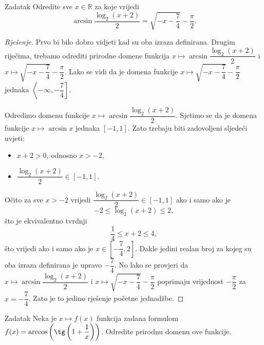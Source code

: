 \begin{exercise}{Zadatak}
Odredite sve \(x\in \mathbb{R}\) za koje vrijedi
\[\arcsin{\dfrac{\log_2(x+2)}{2}}=\sqrt{-x-\dfrac{7}{4}}-\dfrac{\pi}{2}.\]
\end{exercise}
\begin{proof}[Rješenje]
Prvo bi bilo dobro vidjeti kad su oba izraza definirana. Drugim riječima, trebamo odrediti prirodne domene funkcija \(x\mapsto \arcsin{\dfrac{\log_2(x+2)}{2}}\) i \(x\mapsto \sqrt{-x-\dfrac{7}{4}}-\dfrac{\pi}{2}\). Lako se vidi da je domena funkcije \(x\mapsto \sqrt{-x-\dfrac{7}{4}}-\dfrac{\pi}{2}\) jednaka \(\left\langle -\infty, -\dfrac{7}{4}\right]\).

Odredimo domenu funkcije \(x\mapsto \arcsin{\dfrac{\log_2(x+2)}{2}}\). Sjetimo se da je domena funkcije \(x\mapsto \arcsin{x}\) jednaka \([-1, 1]\). Zato trebaju biti zadovoljeni sljedeći uvjeti:
\begin{itemize}
\item \(x+2>0\), odnosno \(x>-2\),
\item \(\dfrac{\log_2(x+2)}{2}\in [-1, 1]\).
\end{itemize}
Očito za sve \(x>-2\) vrijedi \(\dfrac{\log_2(x+2)}{2}\in [-1, 1]\) ako i samo ako je
\[-2\leq \log_2(x+2)\leq 2,\]
što je ekvivalentno tvrdnji
\[\dfrac{1}{4}\leq x+2\leq 4,\]
što vrijedi ako i samo ako je \(x\in \left[-\dfrac{7}{4}, 2\right]\). Dakle jedini realan broj za kojeg su oba izraza definirana je upravo \(-\dfrac{7}{4}\). No lako se provjeri da \(x\mapsto \arcsin{\dfrac{\log_2(x+2)}{2}}\) i \(x\mapsto \sqrt{-x-\dfrac{7}{4}}-\dfrac{\pi}{2}\) poprimaju vrijednost \(-\dfrac{\pi}{2}\) za \(x=-\dfrac{7}{4}\). Zato je to jedino rješenje početne jednadžbe.
\end{proof}
\begin{exercise}{Zadatak}
Neka je \(x\mapsto f(x)\) funkcija zadana formulom \(f(x)=\arccos\left(\tg\left(1+\dfrac{1}{x}\right)\right)\). Odredite prirodnu domenu ove funkcije.
\end{exercise}
